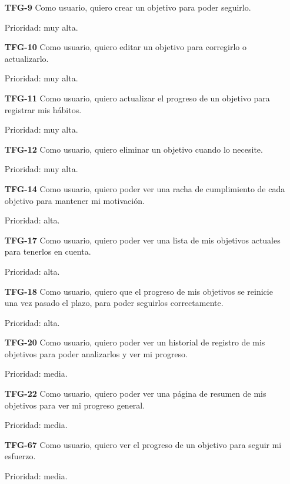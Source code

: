 \documentclass[10pt, a4paper]{aqademic}
\begin{document}
\begin{itemize}[leftmargin=16mm]
	\item [\textbf{TFG-9}] Como usuario, quiero crear un objetivo para poder seguirlo.
	
	Prioridad: muy alta.
	
	\item [\textbf{TFG-10}] Como usuario, quiero editar un objetivo para corregirlo o actualizarlo.
	
	Prioridad: muy alta.
	
	\item [\textbf{TFG-11}] Como usuario, quiero actualizar el progreso de un objetivo para registrar mis hábitos.
	
	Prioridad: muy alta.
	
	\item [\textbf{TFG-12}] Como usuario, quiero eliminar un objetivo cuando lo necesite.
	
	Prioridad: muy alta.
	
	\item [\textbf{TFG-14}] Como usuario, quiero poder ver una racha de cumplimiento de cada objetivo para mantener mi motivación.
	
	Prioridad: alta.
	
	\item [\textbf{TFG-17}] Como usuario, quiero poder ver una lista de mis objetivos actuales para tenerlos en cuenta.
	
	Prioridad: alta.
	
	\item [\textbf{TFG-18}] Como usuario, quiero que el progreso de mis objetivos se reinicie una vez pasado el plazo, para poder seguirlos correctamente.
	
	Prioridad: alta.
	
	\item [\textbf{TFG-20}] Como usuario, quiero poder ver un historial de registro de mis objetivos para poder analizarlos y ver mi progreso.
	
	Prioridad: media.
	
	\item [\textbf{TFG-22}] Como usuario, quiero poder ver una página de resumen de mis objetivos para ver mi progreso general.
	
	Prioridad: media.
	
	\item [\textbf{TFG-67}] Como usuario, quiero ver el progreso de un objetivo para seguir mi esfuerzo.
	
	Prioridad: media.
	

\end{itemize}
\end{document}
